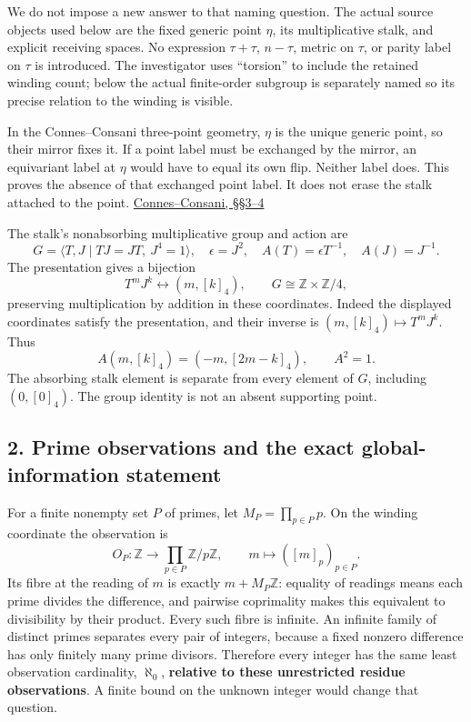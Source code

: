 \documentclass[
]{article}
\begin{document}
We do not impose a new answer to that naming question. The actual source
objects used below are the fixed generic point \(\eta\), its
multiplicative stalk, and explicit receiving spaces. No expression
\(\tau+\tau\), \(n-\tau\), metric on \(\tau\), or parity label on
\(\tau\) is introduced. The investigator uses ``torsion'' to include the
retained winding count; below the actual finite-order subgroup is
separately named so its precise relation to the winding is visible.

In the Connes--Consani three-point geometry, \(\eta\) is the unique
generic point, so their mirror fixes it. If a point label must be
exchanged by the mirror, an equivariant label at \(\eta\) would have to
equal its own flip. Neither label does. This proves the absence of that
exchanged point label. It does not erase the stalk attached to the
point. \href{https://arxiv.org/html/2609.00299v1}{Connes--Consani,
§§3--4}

The stalk's nonabsorbing multiplicative group and action are \[
G=\langle T,J\mid TJ=JT,\ J^4=1\rangle,
\quad \epsilon=J^2,
\quad A(T)=\epsilon T^{-1},\quad A(J)=J^{-1}.
\] The presentation gives a bijection \[
T^mJ^k\longleftrightarrow(m,[k]_4),
\qquad G\cong\mathbb Z\times\mathbb Z/4,
\] preserving multiplication by addition in these coordinates. Indeed
the displayed coordinates satisfy the presentation, and their inverse is
\((m,[k]_4)\mapsto T^mJ^k\). Thus \[
A(m,[k]_4)=(-m,[2m-k]_4),\qquad A^2=1.
\] The absorbing stalk element is separate from every element of \(G\),
including \((0,[0]_4)\). The group identity is not an absent supporting
point.

\subsection{2. Prime observations and the exact global-information
statement}\label{prime-observations-and-the-exact-global-information-statement}

For a finite nonempty set \(P\) of primes, let \(M_P=\prod_{p\in P}p\).
On the winding coordinate the observation is \[
O_P:\mathbb Z\longrightarrow\prod_{p\in P}\mathbb Z/p\mathbb Z,
\qquad m\longmapsto([m]_p)_{p\in P}.
\] Its fibre at the reading of \(m\) is exactly \(m+M_P\mathbb Z\):
equality of readings means each prime divides the difference, and
pairwise coprimality makes this equivalent to divisibility by their
product. Every such fibre is infinite. An infinite family of distinct
primes separates every pair of integers, because a fixed nonzero
difference has only finitely many prime divisors. Therefore every
integer has the same least observation cardinality, \(\aleph_0\),
\textbf{relative to these unrestricted residue observations}. A finite
bound on the unknown integer would change that question.
\end{document}
